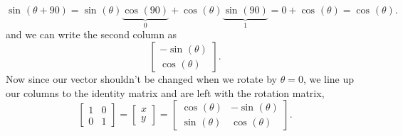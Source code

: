 \documentclass{report}
\begin{document}
\[
\sin^{  } \left( \theta + 90 \right) = \sin^{  } \left( \theta \right) \underbrace{ \cos^{  } \left( 90 \right) }_{ 0 }  + \cos^{  } \left( \theta \right) \underbrace{ \sin^{  } \left( 90 \right) }_{ 1 }  = 0 + \cos^{  } \left( \theta \right) = \cos^{  } \left( \theta \right)
.\] 
and we can write the second column as 
\[
\begin{bmatrix} -\sin^{  } \left( \theta \right) \\ \cos^{  } \left( \theta \right)  \end{bmatrix} 
.\]
Now since our vector shouldn't be changed when we rotate by $ \theta = 0$, we line up our columns to the identity matrix and are left with the rotation matrix,
\[
	\begin{bmatrix} 1 & 0 \\ 0 & 1 \end{bmatrix} = \begin{bmatrix} x \\ y \end{bmatrix} = \begin{bmatrix} \cos^{  } \left( \theta \right) & -\sin^{  } \left( \theta \right) \\ \sin^{  } \left( \theta \right) & \cos^{  } \left( \theta \right)  \end{bmatrix}
.\] 
\newpage
\end{document}

